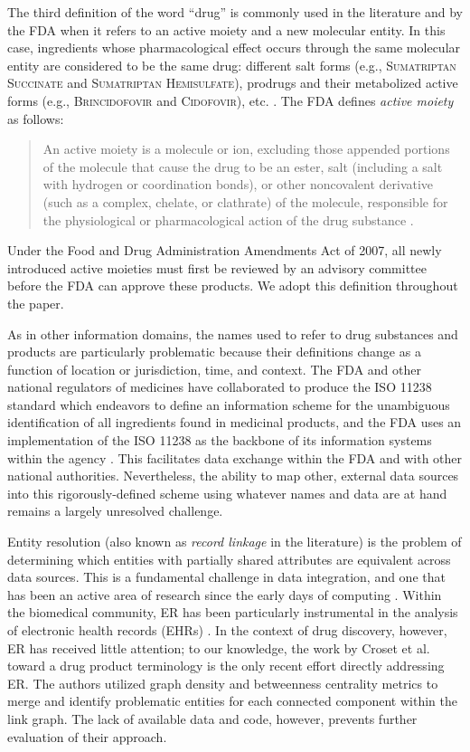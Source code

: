 \documentclass{bmcart}
\begin{document}
The third definition of the word ``drug'' is commonly used in
the literature and by the FDA when it refers to an active moiety
and a new molecular entity. In this case, ingredients whose
pharmacological effect occurs through the same molecular entity are
considered to be the same drug: different salt forms (e.g., 
\textsc{Sumatriptan Succinate} and \textsc{Sumatriptan Hemisulfate}), 
prodrugs and their metabolized active forms (e.g., \textsc{Brincidofovir} 
and \textsc{Cidofovir}), etc. \cite{NME}. The FDA defines \emph{active
  moiety} as follows:
\begin{quote}An active moiety is a molecule or
ion, excluding those appended portions of the molecule that cause the
drug to be an ester, salt (including a salt with hydrogen or
coordination bonds), or other noncovalent derivative (such as a
complex, chelate, or clathrate) of the molecule, responsible for the
physiological or pharmacological action of the drug
substance \cite{CFR2012}.
\end{quote}
Under the Food and Drug Administration Amendments Act of 2007, 
all newly introduced active moieties must first be reviewed by 
an advisory committee before the FDA can approve these products. 
We adopt this definition throughout the paper.

As in other information domains, the names used to refer to drug
substances and products are particularly problematic because their
definitions change as a function of location or jurisdiction, time, and
context. The FDA and other national regulators of medicines have
collaborated to produce the ISO 11238 standard \cite{ISO11238} which
endeavors to define an information scheme for the unambiguous
identification of all ingredients found in medicinal products, and the
FDA uses an implementation of the ISO 11238 as the backbone of its
information systems within the agency \cite{GSRS}. This facilitates
data exchange within the FDA and with other national authorities.
Nevertheless, the ability to map other, external data sources into
this rigorously-defined scheme using whatever names and data are at
hand remains a largely unresolved challenge. 

Entity resolution (also known as \emph{record linkage} in the
literature) is the problem of determining which entities with
partially shared attributes are equivalent across data sources. This
is a fundamental challenge in data integration, and one that has been
an active area of research since the early days of computing
\cite{Newcombe1959}. Within the biomedical community, ER has been
particularly instrumental in the analysis of electronic health records
(EHRs) \cite{Karr2019}. In the context of drug discovery, however, ER
has received little attention; to our knowledge, the work by Croset
et al. toward a drug product terminology \cite{Croset2015} is the only
recent effort directly addressing ER. The authors utilized
graph density and betweenness centrality metrics to merge and identify 
problematic entities for each connected component within the link
graph. The lack of available data and code, however, prevents further
evaluation of their approach.
\end{document}
